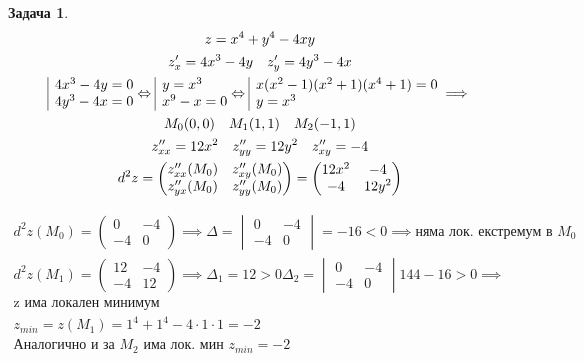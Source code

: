 \documentclass[a4paper,fleqn,12pt]{article}
\theoremstyle{definition}
\newtheorem{task}{Задача}[subsection]
\begin{document}
\begin{task}
\begin{gather*}
z = x^4 + y^4 - 4xy\\
z'_x = 4x^3 - 4y \quad z'_y =4y^3 - 4x\\
\begin{array}{|l@{}}
4x^3 - 4y = 0\\
4y^3 - 4x = 0
\end{array} \Leftrightarrow
\begin{array}{|l@{}}
y = x^3\\
x^9 - x = 0
\end{array} \Leftrightarrow
\begin{array}{|l@{}}
x(x^2-1)(x^2+1)(x^4+1) = 0\\
y = x^3
\end{array} \implies\\
M_0(0,0) \quad M_1(1,1) \quad M_2(-1,1) \\
z''_{xx} = 12x^2 \quad z''_{yy} = 12y^2 \quad z''_{xy} = -4 \\
d^2z = 
\begin{pmatrix}
z''_{xx}(M_0) & z''_{xy}(M_0)\\
z''_{yx}(M_0) & z''_{yy}(M_0)
\end{pmatrix} = 
\begin{pmatrix}
12x^2 & -4\\
-4 & 12y^2
\end{pmatrix} 
\end{gather*}

\begin{gather*}
d^2z(M_0) = 
\begin{pmatrix}
0 & -4\\
-4 & 0
\end{pmatrix} \implies \Delta = 
\begin{vmatrix}
0 & -4\\
-4 & 0
\end{vmatrix} = -16 < 0 \implies \text{няма лок. екстремум в } M_0 \\
d^2z(M_1) = 
\begin{pmatrix}
12 & -4\\
-4 & 12
\end{pmatrix} \implies \Delta_1 = 12 > 0 \Delta_2 = 
\begin{vmatrix}
0 & -4\\
-4 & 0
\end{vmatrix} 144 - 16 > 0 \implies \\
\text{z има локален минимум}\\
z_{min} = z(M_1) = 1^4 + 1^4 - 4 \cdot 1 \cdot 1 = -2\\
\text{Аналогично и за $M_2$ има лок. мин $z_{min} = -2$}
\end{gather*} 
\end{task}
\end{document}
